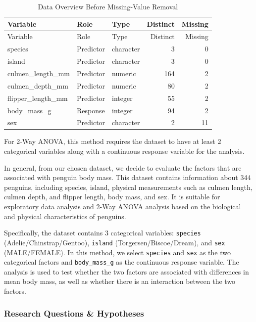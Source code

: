 \documentclass[
  11pt,
]{article}
\begin{document}
\begin{longtable}[]{@{}lllrr@{}}
\caption{Data Overview Before Missing-Value Removal}\tabularnewline
\toprule\noalign{}
Variable & Role & Type & Distinct & Missing \\
\midrule\noalign{}
\endfirsthead
\toprule\noalign{}
Variable & Role & Type & Distinct & Missing \\
\midrule\noalign{}
\endhead
\bottomrule\noalign{}
\endlastfoot
species & Predictor & character & 3 & 0 \\
island & Predictor & character & 3 & 0 \\
culmen\_length\_mm & Predictor & numeric & 164 & 2 \\
culmen\_depth\_mm & Predictor & numeric & 80 & 2 \\
flipper\_length\_mm & Predictor & integer & 55 & 2 \\
body\_mass\_g & Response & integer & 94 & 2 \\
sex & Predictor & character & 2 & 11 \\
\end{longtable}

For 2-Way ANOVA, this method requires the dataset to have at least 2
categorical variables along with a continuous response variable for the
analysis.

In general, from our chosen dataset, we decide to evaluate the factors
that are associated with penguin body mass. This dataset contains
information about 344 penguins, including species, island, physical
measurements such as culmen length, culmen depth, and flipper length,
body mass, and sex. It is suitable for exploratory data analysis and
2-Way ANOVA analysis based on the biological and physical
characteristics of penguins.

Specifically, the dataset contains 3 categorical variables:
\texttt{species} (Adelie/Chinstrap/Gentoo), \texttt{island}
(Torgersen/Biscoe/Dream), and \texttt{sex} (MALE/FEMALE). In this
method, we select \texttt{species} and \texttt{sex} as the two
categorical factors and \texttt{body\_mass\_g} as the continuous
response variable. The analysis is used to test whether the two factors
are associated with differences in mean body mass, as well as whether
there is an interaction between the two factors.

\subsubsection{Research Questions \&
Hypotheses}\label{research-questions-hypotheses}
\end{document}

